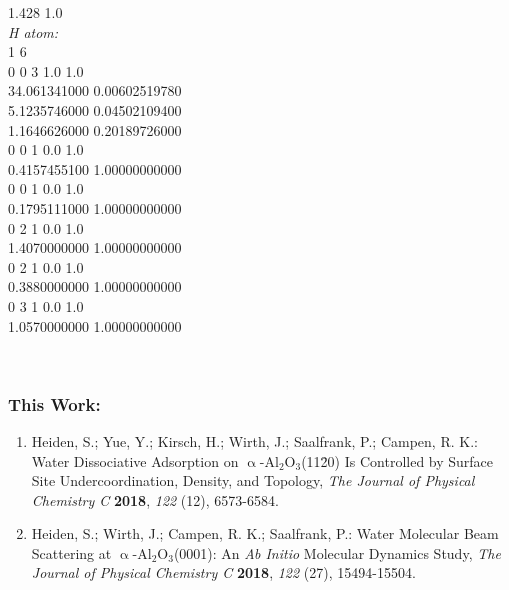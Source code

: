 \documentclass[11pt,DIV=13,BCOR=5mm,a4paper,headinclude]{scrbook}
\begin{document}
\begin{spacing}{0.5}
{ 1.428             1.0\\
\textit{H atom:}\\
1 6\\
0 0 3 1.0 1.0\\
 34.061341000 0.00602519780\\
 5.1235746000 0.04502109400\\
 1.1646626000 0.20189726000\\
0 0 1 0.0 1.0\\
 0.4157455100 1.00000000000\\
0 0 1 0.0 1.0\\
 0.1795111000 1.00000000000\\
0 2 1 0.0 1.0\\
 1.4070000000 1.00000000000\\
0 2 1 0.0 1.0\\
 0.3880000000 1.00000000000\\
0 3 1 0.0 1.0\\
 1.0570000000 1.00000000000\\}
 \end{spacing}
\renewcommand{\cleardoublepage}{}
~
\clearpage
~
\clearpage
{}

\subsubsection{This Work:}

\begin{enumerate}[itemsep=0.25\baselineskip]
  \item Heiden, S.; Yue, Y.; Kirsch, H.; Wirth, J.; Saalfrank, P.; Campen, R. K.: {\frqq}Water Dissociative Adsorption on $\upalpha$-Al$_2$O$_3$(11\=20) Is Controlled by Surface Site Undercoordination, Density, and Topology{\flqq}, \textit{The Journal of Physical Chemistry C} \textbf{2018}, \textit{122} (12), 6573-6584.
  \item Heiden, S.; Wirth, J.; Campen, R. K.; Saalfrank, P.: {\frqq}Water Molecular Beam Scattering at $\upalpha$-Al$_2$O$_3$(0001): An \textit{Ab Initio} Molecular Dynamics Study{\flqq}, \textit{The Journal of Physical Chemistry C} \textbf{2018}, \textit{122} (27), 15494-15504.

\end{enumerate}
\end{document}
